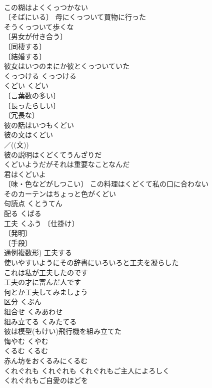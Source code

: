 \documentclass[8pt]{extreport}
\begin{document}
\begin{CJK}{UTF8}{min}
\\	この糊はよくくっつかない 
\\	〔そばにいる〕 母にくっついて買物に行った 
\\	そうくっついて歩くな 
\\	〔男女が付き合う〕
\\	〔同棲する〕
\\	〔結婚する〕
\\	彼女はいつのまにか彼とくっついていた 
\\	くっつける	くっつける	
\\	くどい	くどい	
\\	〔言葉数の多い〕
\\	〔長ったらしい〕
\\	〔冗長な〕
\\	彼の話はいつもくどい 
\\	彼の文はくどい 
\\	／((文)) 
\\	彼の説明はくどくてうんざりだ 
\\	くどいようだがそれは重要なことなんだ 
\\	君はくどいよ 
\\	〔味・色などがしつこい〕 この料理はくどくて私の口に合わない 
\\	そのカーテンはちょっと色がくどい 
\\	句読点	くとうてん	
\\	配る	くばる	
\\	工夫	くふう	〔仕掛け〕
\\	〔発明〕
\\	〔手段〕
\\	通例複数形) 工夫する 
\\	使いやすいようにその辞書にいろいろと工夫を凝らした 
\\	これは私が工夫したのです 
\\	工夫の才に富んだ人です 
\\	何とか工夫してみましょう 
\\	区分	くぶん	
\\	組合せ	くみあわせ	
\\	組み立てる	くみたてる	
\\	彼は模型(もけい)飛行機を組み立てた 
\\	悔やむ	くやむ	
\\	くるむ	くるむ	
\\	赤ん坊をおくるみにくるむ 
\\	くれぐれも	くれぐれも	くれぐれもご主人によろしく 
\\	くれぐれもご自愛のほどを 

\end{CJK}
\end{document}
